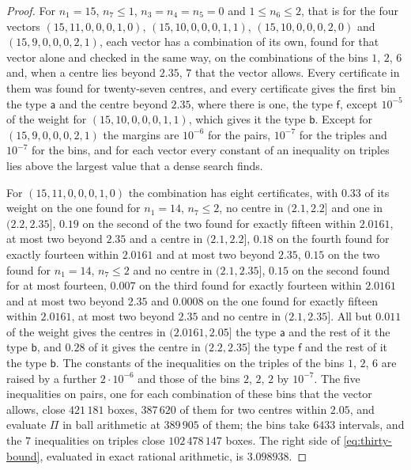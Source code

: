 \documentclass[11pt,reqno]{amsart}
\renewcommand{\_}{\origunderscore\allowbreak}
\numberwithin{equation}{section}
\theoremstyle{plain}
\theoremstyle{definition}
\theoremstyle{remark}
\begin{document}
\begin{proof}
For $n_1=15$, $n_7\le1$, $n_3=n_4=n_5=0$ and $1\le n_6\le2$, that is for
the four vectors $(15,11,0,0,0,1,0)$, $(15,10,0,0,0,1,1)$,
$(15,10,0,0,0,2,0)$ and $(15,9,0,0,0,2,1)$, each vector has a combination
of its own, found for that vector alone and checked in the same way, on the
combinations of the bins $1$, $2$, $6$ and, when a centre lies beyond
$2.35$, $7$ that the vector allows. Every certificate in them was found for
twenty-seven centres, and every certificate gives the first bin the type
$\mathsf a$ and the centre beyond $2.35$, where there is one, the type
$\mathsf f$, except $10^{-5}$ of the weight for $(15,10,0,0,0,1,1)$, which
gives it the type $\mathsf b$. Except for $(15,9,0,0,0,2,1)$ the margins
are $10^{-6}$ for the pairs, $10^{-7}$ for the triples and $10^{-7}$ for
the bins, and for each vector every constant of an inequality on triples
lies above the largest value that a dense search finds.

For $(15,11,0,0,0,1,0)$ the combination has eight certificates, with $0.33$
of its weight on the one found for $n_1=14$, $n_7\le2$, no centre in
$(2.1,2.2]$ and one in $(2.2,2.35]$, $0.19$ on the second of the two found
for exactly fifteen within $2.0161$, at most two beyond $2.35$ and a centre
in $(2.1,2.2]$, $0.18$ on the fourth found for exactly fourteen within
$2.0161$ and at most two beyond $2.35$, $0.15$ on the two found for
$n_1=14$, $n_7\le2$ and no centre in $(2.1,2.35]$, $0.15$ on the second
found for at most fourteen, $0.007$ on the third found for exactly fourteen
within $2.0161$ and at most two beyond $2.35$ and $0.0008$ on the one found
for exactly fifteen within $2.0161$, at most two beyond $2.35$ and no centre
in $(2.1,2.35]$. All but $0.011$ of the weight gives the centres in
$(2.0161,2.05]$ the type $\mathsf a$ and the rest of it the type
$\mathsf b$, and $0.28$ of it gives the centre in $(2.2,2.35]$ the type
$\mathsf f$ and the rest of it the type $\mathsf b$. The constants of the
inequalities on the triples of the bins $1$, $2$, $6$ are raised by a
further $2\cdot10^{-6}$ and those of the bins $2$, $2$, $2$ by $10^{-7}$.
The five inequalities on pairs, one for each combination of these bins that
the vector allows, close $421\,181$ boxes, $387\,620$ of them for two
centres within $2.05$, and evaluate $\Pi$ in ball arithmetic at
$389\,905$ of them; the bins take $6433$ intervals, and the $7$
inequalities on triples close $102\,478\,147$ boxes. The right side of
\eqref{eq:thirty-bound}, evaluated in exact rational arithmetic, is
$3.098938$.


\end{proof}
\end{document}
